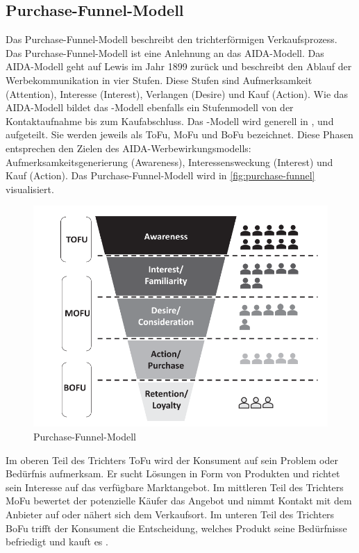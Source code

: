 \subsection{Purchase-Funnel-Modell}
\label{PurchaseFunnelModell}
Das Purchase-Funnel-Modell beschreibt den trichterförmigen Verkaufsprozess. Das Purchase-Funnel-Modell ist eine Anlehnung an das AIDA-Modell. Das AIDA-Modell geht auf Lewis im Jahr 1899 zurück und beschreibt den Ablauf der Werbekommunikation in vier Stufen. Diese Stufen sind Aufmerksamkeit (Attention), Interesse (Interest), Verlangen (Desire) und Kauf (Action). Wie das AIDA-Modell bildet das -Modell ebenfalls ein Stufenmodell von der Kontaktaufnahme bis zum Kaufabschluss. Das -Modell wird generell in ,  und  aufgeteilt. Sie werden jeweils als \ac{ToFu}, \ac{MoFu} und \ac{BoFu} bezeichnet. Diese Phasen entsprechen den Zielen des AIDA-Werbewirkungsmodells: Aufmerksamkeitsgenerierung (Awareness), Interessensweckung (Interest) und Kauf (Action). Das Purchase-Funnel-Modell wird in \autoref{fig:purchase-funnel} visualisiert.
\begin{figure}[H]
    \centering
    \includegraphics[width=0.75\linewidth]{images/Funnel.png}
    \caption{Purchase-Funnel-Modell \cite{Kleinjohann2024}}
    \label{fig:purchase-funnel}
\end{figure}
\noindent
Im oberen Teil des Trichters \ac{ToFu} wird der Konsument auf sein Problem oder Bedürfnis aufmerksam. Er sucht Lösungen in Form von Produkten und richtet sein Interesse auf das verfügbare Marktangebot. Im mittleren Teil des Trichters \ac{MoFu} bewertet der potenzielle Käufer das Angebot und nimmt Kontakt mit dem Anbieter auf oder nähert sich dem Verkaufsort. Im unteren Teil des Trichters \ac{BoFu} trifft der Konsument die Entscheidung, welches Produkt seine Bedürfnisse befriedigt und kauft es \cite{Kleinjohann2024}.
